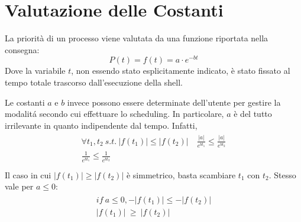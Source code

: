\documentclass[11pt]{article}
\begin{document}
\section{Valutazione delle Costanti}

La priorit\`a di un processo viene valutata da una funzione riportata nella consegna:
$$
P(t) = f(t) = a \cdot e^{-bt}
$$
Dove la variabile $t$, non essendo stato esplicitamente indicato, \`e stato fissato al tempo totale
 trascorso dall'esecuzione della shell.

Le costanti $a$ e $b$  invece possono essere determinate dell'utente per gestire la
modalit\'a secondo cui effettuare lo scheduling. In particolare, $a$ \`e del tutto irrilevante
in quanto indipendente dal tempo.
Infatti,
\begin{align}
\begin{split}
 \forall t_1, t_2\ s.t.\ |f(t_1)| \le |f(t_2)| \quad \frac{|a|}{e^{bt_1}} \le \frac{|a|}{e^{bt_2}} \\
  \frac{1}{e^{bt_1}} \le \frac{1}{e^{bt_2}}\\
\end{split}
\end{align}
Il caso in cui $|f(t_1)| \ge |f(t_2)| $ \`e simmetrico, basta scambiare $t_1$ con $t_2$. Stesso vale per
$a \le 0$:
\begin{align}
\begin{split}
 if\ a \le 0, -|f(t_1)| \le -|f(t_2)| \\
 			   |f(t_1)|\ \ge\ |f(t_2)|
\end{split}
\end{align}
\end{document}
